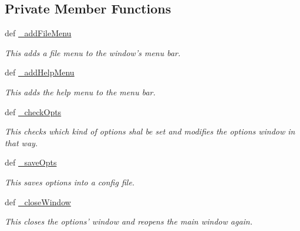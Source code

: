 \subsection*{\-Private \-Member \-Functions}
\begin{DoxyCompactItemize}
\item 
def \hyperlink{classgui_1_1window2_1_1optWindow_aba31902186de9c54cc3cba810c1f3634}{\-\_\-add\-File\-Menu}
\begin{DoxyCompactList}\small\item\em \-This adds a file menu to the window's menu bar. \end{DoxyCompactList}\item 
\hypertarget{classgui_1_1window2_1_1optWindow_a67ef40998197523b8ce51ec49aa57b94}{def \hyperlink{classgui_1_1window2_1_1optWindow_a67ef40998197523b8ce51ec49aa57b94}{\-\_\-add\-Help\-Menu}}\label{classgui_1_1window2_1_1optWindow_a67ef40998197523b8ce51ec49aa57b94}

\begin{DoxyCompactList}\small\item\em \-This adds the help menu to the menu bar. \end{DoxyCompactList}\item 
def \hyperlink{classgui_1_1window2_1_1optWindow_a5d355464940badfea4734a52190bfbc7}{\-\_\-check\-Opts}
\begin{DoxyCompactList}\small\item\em \-This checks which kind of options shal be set and modifies the options window in that way. \end{DoxyCompactList}\item 
def \hyperlink{classgui_1_1window2_1_1optWindow_a3d7a5345f604f41ff6563f73376434bf}{\-\_\-save\-Opts}
\begin{DoxyCompactList}\small\item\em \-This saves options into a config file. \end{DoxyCompactList}\item 
\hypertarget{classgui_1_1window2_1_1optWindow_a5d2809680f561c4d498b27120a0adbaa}{def \hyperlink{classgui_1_1window2_1_1optWindow_a5d2809680f561c4d498b27120a0adbaa}{\-\_\-close\-Window}}\label{classgui_1_1window2_1_1optWindow_a5d2809680f561c4d498b27120a0adbaa}

\begin{DoxyCompactList}\small\item\em \-This closes the options' window and reopens the main window again. \end{DoxyCompactList}\end{DoxyCompactItemize}


